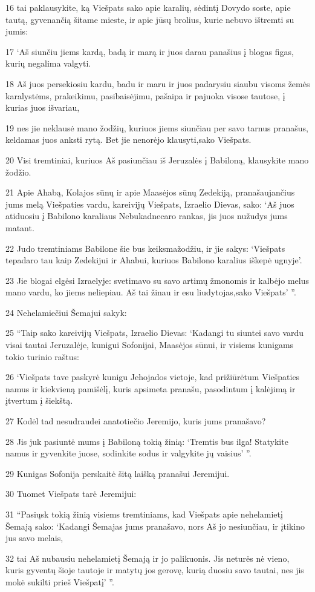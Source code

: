 \par 16 tai paklausykite, ką Viešpats sako apie karalių, sėdintį Dovydo soste, apie tautą, gyvenančią šitame mieste, ir apie jūsų brolius, kurie nebuvo ištremti su jumis: 
\par 17 ‘Aš siunčiu jiems kardą, badą ir marą ir juos darau panašius į blogas figas, kurių negalima valgyti. 
\par 18 Aš juos persekiosiu kardu, badu ir maru ir juos padarysiu siaubu visoms žemės karalystėms, prakeikimu, pasibaisėjimu, pašaipa ir pajuoka visose tautose, į kurias juos išvariau, 
\par 19 nes jie neklausė mano žodžių, kuriuos jiems siunčiau per savo tarnus pranašus, keldamas juos anksti rytą. Bet jie nenorėjo klausyti,­sako Viešpats.­ 
\par 20 Visi tremtiniai, kuriuos Aš pasiunčiau iš Jeruzalės į Babiloną, klausykite mano žodžio. 
\par 21 Apie Ahabą, Kolajos sūnų ir apie Maasėjos sūnų Zedekiją, pranašaujančius jums melą Viešpaties vardu, kareivijų Viešpats, Izraelio Dievas, sako: ‘Aš juos atiduosiu į Babilono karaliaus Nebukadnecaro rankas, jis juos nužudys jums matant. 
\par 22 Judo tremtiniams Babilone šie bus keiksmažodžiu, ir jie sakys: ‘Viešpats tepadaro tau kaip Zedekijui ir Ahabui, kuriuos Babilono karalius iškepė ugnyje’. 
\par 23 Jie blogai elgėsi Izraelyje: svetimavo su savo artimų žmonomis ir kalbėjo melus mano vardu, ko jiems neliepiau. Aš tai žinau ir esu liudytojas,­sako Viešpats’ ”. 
\par 24 Nehelamiečiui Šemajui sakyk: 
\par 25 “Taip sako kareivijų Viešpats, Izraelio Dievas: ‘Kadangi tu siuntei savo vardu visai tautai Jeruzalėje, kunigui Sofonijai, Maasėjos sūnui, ir visiems kunigams tokio turinio raštus: 
\par 26 ‘Viešpats tave paskyrė kunigu Jehojados vietoje, kad prižiūrėtum Viešpaties namus ir kiekvieną pamišėlį, kuris apsimeta pranašu, pasodintum į kalėjimą ir įtvertum į šiekštą. 
\par 27 Kodėl tad nesudraudei anatotiečio Jeremijo, kuris jums pranašavo? 
\par 28 Jis juk pasiuntė mums į Babiloną tokią žinią: ‘Tremtis bus ilga! Statykite namus ir gyvenkite juose, sodinkite sodus ir valgykite jų vaisius’ ”. 
\par 29 Kunigas Sofonija perskaitė šitą laišką pranašui Jeremijui. 
\par 30 Tuomet Viešpats tarė Jeremijui: 
\par 31 “Pasiųsk tokią žinią visiems tremtiniams, kad Viešpats apie nehelamietį Šemają sako: ‘Kadangi Šemajas jums pranašavo, nors Aš jo nesiunčiau, ir įtikino jus savo melais, 
\par 32 tai Aš nubausiu nehelamietį Šemają ir jo palikuonis. Jis neturės nė vieno, kuris gyventų šioje tautoje ir matytų jos gerovę, kurią duosiu savo tautai, nes jis mokė sukilti prieš Viešpatį’ ”.



